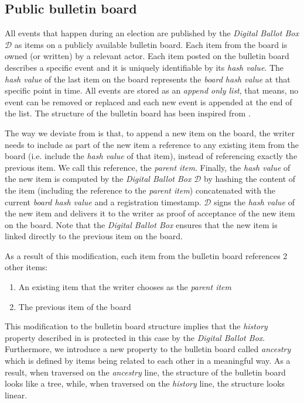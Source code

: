 \subsection{Public bulletin board} \label{sec: public bulletin board}
All events that happen during an election are published by the \textit{Digital Ballot Box} $\mathcal{D}$ as items on a publicly available bulletin board. Each item from the board is owned (or written) by a relevant actor. Each item posted on the bulletin board describes a specific event and it is uniquely identifiable by its \textit{hash value}. The \textit{hash value} of the last item on the board represents the \textit{board hash value} at that specific point in time. All events are stored as an \textit{append only list}, that means, no event can be removed or replaced and each new event is appended at the end of the list. The structure of the bulletin board has been inspired from \cite{Heather09}.

The way we deviate from \cite{Heather09} is that, to append a new item on the board, the writer needs to include as part of the new item a reference to any existing item from the board (i.e. include the \textit{hash value} of that item), instead of referencing exactly the previous item. We call this reference, the \textit{parent item}. Finally, the \textit{hash value} of the new item is computed by the \textit{Digital Ballot Box} $\mathcal{D}$ by hashing the content of the item (including the reference to the \textit{parent item}) concatenated with the current \textit{board hash value} and a registration timestamp. $\mathcal{D}$ signs the \textit{hash value} of the new item and delivers it to the writer as proof of acceptance of the new item on the board. Note that the \textit{Digital Ballot Box} ensures that the new item is linked directly to the previous item on the board.

As a result of this modification, each item from the bulletin board references 2 other items:
\begin{enumerate}
    \item An existing item that the writer chooses as the \textit{parent item}
    \item The previous item of the board
\end{enumerate}

This modification to the bulletin board structure implies that the \textit{history} property described in \cite{Heather09} is protected in this case by the \textit{Digital Ballot Box}. Furthermore, we introduce a new property to the bulletin board called \textit{ancestry} which is defined by items being related to each other in a meaningful way. As a result, when traversed on the \textit{ancestry} line, the structure of the bulletin board looks like a tree, while, when traversed on the \textit{history} line, the structure looks linear. 

